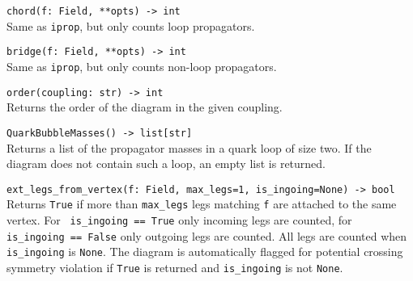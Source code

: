 \begin{basedescript}{\desclabelstyle{\pushlabel}}
   \item[\hspace{-1em}]\colorbox{gray!30}{\lstinline[style=py]|chord(f: Field, **opts) -> int|} \vspace{0.1cm}\\
   Same as \texttt{iprop}, but only counts loop propagators.

   \item[\hspace{-1em}]\colorbox{gray!30}{\lstinline[style=py]|bridge(f: Field, **opts) -> int|} \vspace{0.1cm}\\
   Same as \texttt{iprop}, but only counts non-loop propagators.

   \item[\hspace{-1em}]\colorbox{gray!30}{\lstinline[style=py]|order(coupling: str) -> int|} \vspace{0.1cm}\\
   Returns the order of the diagram in the given coupling.

   \item[\hspace{-1em}]\colorbox{gray!30}{\lstinline[style=py]|QuarkBubbleMasses() -> list[str]|} \vspace{0.1cm}\\
   Returns a list of the propagator masses in a quark loop of size two. If the diagram does not contain such a loop, an empty list is returned.  

   \item[\hspace{-1em}]\colorbox{gray!30}{\lstinline[style=py]{ext_legs_from_vertex(f: Field, max_legs=1, is_ingoing=None) -> bool}} \vspace{0.1cm}\\
   Returns \texttt{True} if more than \texttt{max\_legs} legs matching \texttt{f} are attached to the same vertex. For \lstinline[style=py]| is_ingoing == True| only incoming legs are counted, for \lstinline[style=py]| is_ingoing == False| only outgoing legs are counted. All legs are counted when \texttt{is\_ingoing} is \texttt{None}. The diagram is automatically flagged for potential crossing symmetry violation if \texttt{True} is returned and \texttt{is\_ingoing} is not \texttt{None}.


\end{basedescript}
